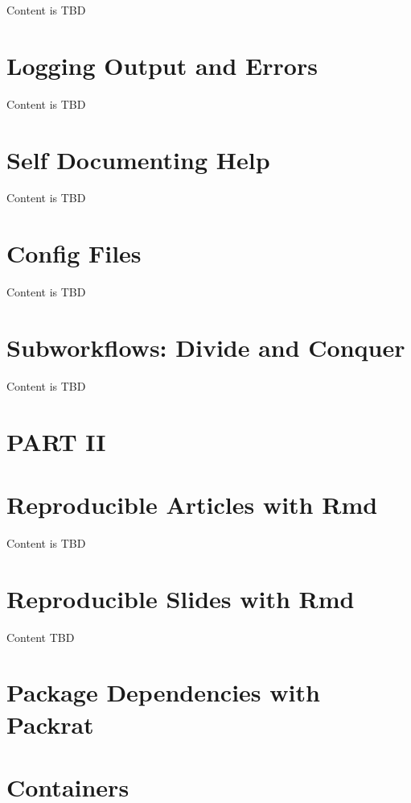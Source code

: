 \documentclass[]{book}
\theoremstyle{definition}
\theoremstyle{definition}
\theoremstyle{definition}
\theoremstyle{remark}
\begin{document}
Content is TBD

\chapter{Logging Output and Errors}\label{logging-output-and-errors}

Content is TBD

\chapter{Self Documenting Help}\label{self-documenting-help}

Content is TBD

\chapter{Config Files}\label{config-files}

Content is TBD

\chapter{Subworkflows: Divide and
Conquer}\label{subworkflows-divide-and-conquer}

Content is TBD

\chapter*{PART II}\label{part-ii}

\chapter{Reproducible Articles with
Rmd}\label{reproducible-articles-with-rmd}

Content is TBD

\chapter{Reproducible Slides with
Rmd}\label{reproducible-slides-with-rmd}

Content TBD

\chapter{Package Dependencies with
Packrat}\label{package-dependencies-with-packrat}

\chapter{Containers}\label{containers}


\end{document}
